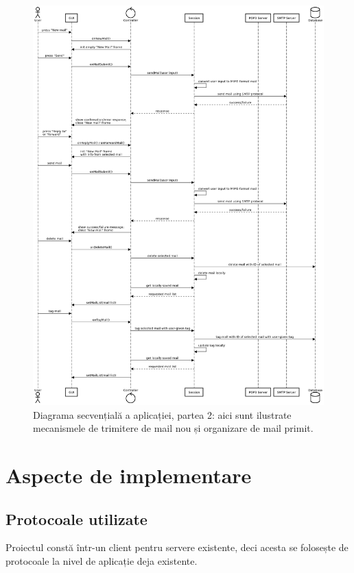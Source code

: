 \documentclass[runningheads]{llncs}
\begin{document}
\begin{figure}
\includegraphics[width=\textwidth]{halfDiagram2.png}
\caption{Diagrama secvențială a aplicației, partea 2: aici sunt ilustrate mecanismele de trimitere de mail nou și organizare de mail primit.} \label{secondhalf}
\end{figure}


\newpage




\section{Aspecte de implementare}

\subsection{Protocoale utilizate}
Proiectul constă într-un client pentru servere existente, deci acesta se folosește de protocoale la nivel de aplicație deja existente.
\end{document}
